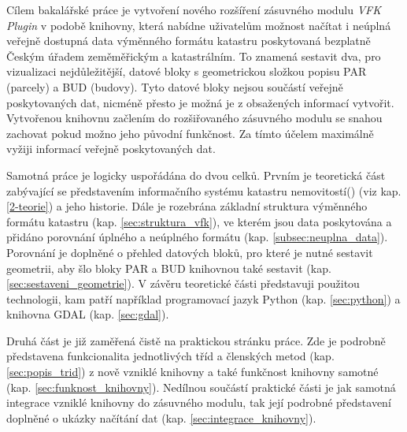Cílem bakalářské práce je vytvoření nového rozšíření zásuvného modulu
\textit{VFK Plugin} v podobě knihovny, která nabídne uživatelům
možnost načítat i neúplná veřejně dostupná data výměnného formátu
katastru poskytovaná bezplatně Českým úřadem zeměměřickým a
katastrálním.  To znamená sestavit dva, pro vizualizaci
nejdůležitější, datové bloky s geometrickou složkou popisu PAR
(parcely) a BUD (budovy). Tyto datové bloky nejsou součástí veřejně poskytovaných
dat, nicméně přesto je možná je z obsažených informací
vytvořit. Vytvořenou knihovnu začlením do rozšiřovaného zásuvného modulu
se snahou zachovat pokud možno jeho původní funkčnost. Za tímto účelem
maximálně vyžiji informací veřejně poskytovaných dat.

Samotná práce je logicky uspořádána do dvou celků. Prvním je
teoretická část zabývající se představením informačního systému
katastru nemovitostí() (viz kap. \ref{2-teorie}) a jeho
historie. Dále je rozebrána základní struktura výměnného formátu
katastru (kap. \ref{sec:struktura_vfk}), ve kterém jsou data
poskytována a přidáno porovnání úplného a neúplného formátu
(kap. \ref{subsec:neuplna_data}).  Porovnání je doplněné o přehled
datových bloků, pro které je nutné sestavit geometrii, aby šlo bloky
PAR a BUD knihovnou také sestavit
(kap. \ref{sec:sestaveni_geometrie}). V závěru teoretické části
představuji použitou technologii, kam patří například programovací
jazyk Python (kap. \ref{sec:python}) a knihovna GDAL
(kap. \ref{sec:gdal}).

Druhá část je již zaměřená čistě na praktickou stránku práce. Zde je
podrobně představena funkcionalita jednotlivých tříd a členských metod
(kap. \ref{sec:popis_trid}) z nově vzniklé knihovny a také funkčnost
knihovny samotné (kap. \ref{sec:funknost_knihovny}). Nedílnou součástí
praktické části je jak samotná integrace vzniklé knihovny do zásuvného
modulu, tak její podrobné představení doplněné o ukázky načítání dat
(kap. \ref{sec:integrace_knihovny}).
